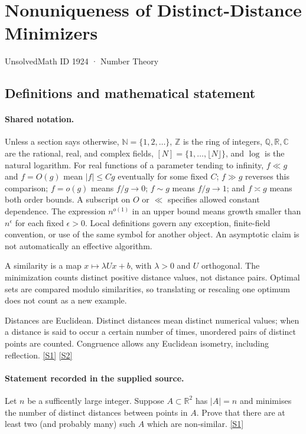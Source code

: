 \documentclass[11pt,a4paper]{article}
\newcommand{\N}{\mathbb{N}}
\newcommand{\Z}{\mathbb{Z}}
\newcommand{\Q}{\mathbb{Q}}
\newcommand{\R}{\mathbb{R}}
\newcommand{\C}{\mathbb{C}}
\newcommand{\sref}[2]{\hyperlink{source:#1:#2}{[S#2]}}
\begin{document}

\setcounter{section}{1923}

\section{Nonuniqueness of Distinct-Distance Minimizers}\label{1924}

{\small\sffamily UnsolvedMath ID 1924 · Number Theory}

\subsection{Definitions and mathematical statement}

\paragraph{Shared notation.}Unless a section says otherwise, $\N=\{1,2,\ldots\}$,
$\Z$ is the ring of integers, $\Q,\R,\C$ are the rational, real, and complex
fields, $[N]=\{1,\ldots,\lfloor N\rfloor\}$, and $\log$ is the natural
logarithm. For real functions of a parameter tending to infinity,
$f\ll g$ and $f=O(g)$ mean $|f|\leq Cg$ eventually for some fixed $C$;
$f\gg g$ reverses this comparison; $f=o(g)$ means $f/g\to0$;
$f\sim g$ means $f/g\to1$; and $f\asymp g$ means both order bounds.
A subscript on $O$ or $\ll$ specifies allowed constant dependence.
The expression $n^{o(1)}$ in an upper bound means growth smaller than
$n^\epsilon$ for each fixed $\epsilon>0$. Local definitions govern any
exception, finite-field convention, or use of the same symbol for another
object. An asymptotic claim is not automatically an effective algorithm.



A similarity is a map $x\mapsto\lambda Ux+b$, with $\lambda>0$ and $U$ orthogonal. The minimization counts distinct positive distance values, not distance pairs. Optimal sets are compared modulo similarities, so translating or rescaling one optimum does not count as a new example.

Distances are Euclidean. Distinct distances mean distinct numerical values; when a distance is said to occur a certain number of times, unordered pairs of distinct points are counted. Congruence allows any Euclidean isometry, including reflection. \sref{1924}{1} \sref{1924}{2}

\paragraph{Statement recorded in the supplied source.}
Let $n$ be a sufficently large integer. Suppose $A\subset \mathbb{R}^2$ has $\lvert A\rvert=n$ and minimises the number of distinct distances between points in $A$. Prove that there are at least two (and probably many) such $A$ which are non-similar. \sref{1924}{1}
\end{document}
